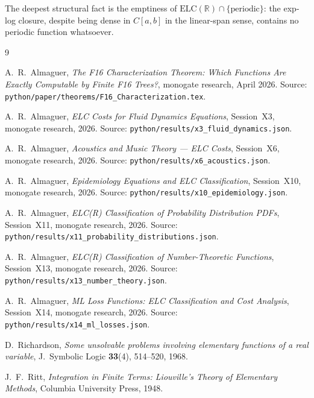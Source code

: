 \documentclass[12pt,a4paper]{article}
\theoremstyle{definition}
\newcommand{\ELC}{\mathrm{ELC}(\mathbb{R})}
\begin{document}
The deepest structural fact is the emptiness of $\ELC\cap\{\text{periodic}\}$:
the exp-log closure, despite being dense in $C[a,b]$ in the linear-span sense,
contains no periodic function whatsoever.

\begin{thebibliography}{9}

  A.\ R.\ Almaguer,
  \emph{The F16 Characterization Theorem: Which Functions Are Exactly
  Computable by Finite F16 Trees?},
  monogate research, April 2026.
  Source: \texttt{python/paper/theorems/F16\_Characterization.tex}.

  A.\ R.\ Almaguer, \emph{ELC Costs for Fluid Dynamics Equations},
  Session~X3, monogate research, 2026.
  Source: \texttt{python/results/x3\_fluid\_dynamics.json}.

  A.\ R.\ Almaguer, \emph{Acoustics and Music Theory --- ELC Costs},
  Session~X6, monogate research, 2026.
  Source: \texttt{python/results/x6\_acoustics.json}.

  A.\ R.\ Almaguer, \emph{Epidemiology Equations and ELC Classification},
  Session~X10, monogate research, 2026.
  Source: \texttt{python/results/x10\_epidemiology.json}.

  A.\ R.\ Almaguer, \emph{ELC(R) Classification of Probability Distribution PDFs},
  Session~X11, monogate research, 2026.
  Source: \texttt{python/results/x11\_probability\_distributions.json}.

  A.\ R.\ Almaguer, \emph{ELC(R) Classification of Number-Theoretic Functions},
  Session~X13, monogate research, 2026.
  Source: \texttt{python/results/x13\_number\_theory.json}.

  A.\ R.\ Almaguer, \emph{ML Loss Functions: ELC Classification and Cost Analysis},
  Session~X14, monogate research, 2026.
  Source: \texttt{python/results/x14\_ml\_losses.json}.

  D.\ Richardson, \emph{Some unsolvable problems involving elementary functions
  of a real variable}, J.\ Symbolic Logic \textbf{33}(4), 514--520, 1968.

  J.\ F.\ Ritt, \emph{Integration in Finite Terms: Liouville's Theory of
  Elementary Methods}, Columbia University Press, 1948.

\end{thebibliography}
\end{document}
